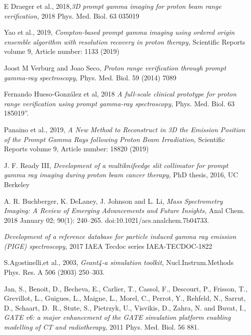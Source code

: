 \documentclass[11pt,a4paper]{article}
\begin{document}
\begin{thebibliography}{9}
	E Draeger et al., 2018,\emph{3D prompt gamma imaging for proton beam range verification,} 2018 Phys. Med. Biol. 63 035019 

Yao et al., 2019, \emph{Compton-based prompt gamma imaging using ordered origin ensemble algorithm with resolution recovery in proton therapy,}  Scientific Reports volume 9, Article number: 1133 (2019) 

Joost M Verburg and Joao Seco, \emph{Proton range verification through prompt gamma-ray spectroscopy,} Phys. Med. Biol. 59 (2014) 7089

Fernando Hueso-González et al, 2018 \emph{A full-scale clinical prototype for proton range verification using prompt gamma-ray spectroscopy,} Phys. Med. Biol. 63 185019”.

Panaino et al., 2019, \emph{A New Method to Reconstruct in 3D the Emission Position of the Prompt Gamma Rays following Proton Beam Irradiation,} Scientific Reports volume 9, Article number: 18820 (2019) 

J. F. Ready III, \emph{Development of a multi­knife­edge slit collimator for prompt gamma ray imaging during proton beam cancer therapy,} PhD thesis, 2016, UC Berkeley

A. R. Buchberger, K. DeLaney, J. Johnson and L. Li, \emph{Mass Spectrometry Imaging: A Review of Emerging Advancements and Future Insights,} Anal Chem. 2018 January 02; 90(1): 240–265. doi:10.1021/acs.analchem.7b04733.


\emph{Development of a reference database for particle induced gamma ray emission (PIGE) spectroscopy}, 2017 IAEA Tecdoc series IAEA-TECDOC-1822


S.Agostinelli,et al., 2003,  \emph{Geant4-a simulation toolkit,} Nucl.Instrum.Methods Phys. Res. A 506 (2003) 250–303.

Jan, S., Benoit, D., Becheva, E., Carlier, T., Cassol, F., Descourt, P.,
  Frisson, T., Grevillot, L., Guigues, L., Maigne, L., Morel, C., Perrot, Y.,
  Rehfeld, N., Sarrut, D., Schaart, D.~R., Stute, S., Pietrzyk, U., Visvikis,
  D., Zahra, N. and  Buvat, I., \emph{GATE v6: a major enhancement of the GATE simulation platform enabling modelling of CT and radiotherapy,} 2011 Phys. Med. Biol. 56 881. 


\end{thebibliography}
\end{document}
